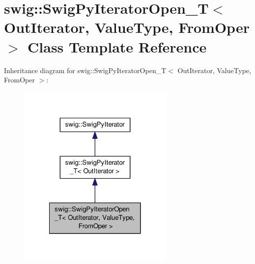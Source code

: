 \hypertarget{classswig_1_1_swig_py_iterator_open___t}{\section{swig\-:\-:Swig\-Py\-Iterator\-Open\-\_\-\-T$<$ Out\-Iterator, Value\-Type, From\-Oper $>$ Class Template Reference}
\label{classswig_1_1_swig_py_iterator_open___t}
}


Inheritance diagram for swig\-:\-:Swig\-Py\-Iterator\-Open\-\_\-\-T$<$ Out\-Iterator, Value\-Type, From\-Oper $>$\-:\nopagebreak
\begin{figure}[H]
\begin{center}
\leavevmode
\includegraphics[width=218pt]{classswig_1_1_swig_py_iterator_open___t__inherit__graph}
\end{center}
\end{figure}
